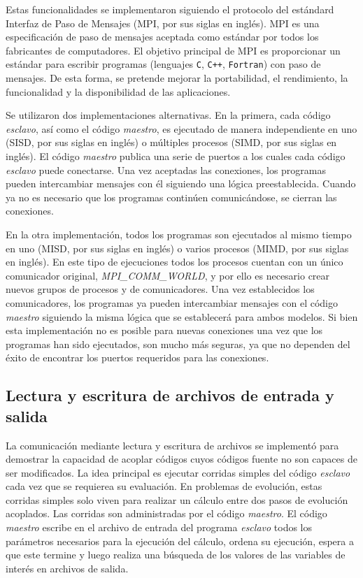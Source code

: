 Estas funcionalidades se implementaron siguiendo el protocolo del estándard Interfaz de Paso de Mensajes (MPI, por sus siglas en inglés). 
MPI es una especificación de paso de mensajes aceptada como estándar
por todos los fabricantes de computadores. 
El objetivo principal de MPI es proporcionar un estándar para escribir
programas (lenguajes \texttt{C}, \texttt{C++}, \texttt{Fortran}) con paso de mensajes. De esta forma, se
pretende mejorar la portabilidad, el rendimiento, la funcionalidad y
la disponibilidad de las aplicaciones.

Se utilizaron dos implementaciones alternativas.
En la primera, cada código \textit{esclavo}, así como el código \textit{maestro},
es ejecutado de manera independiente en uno (SISD, por sus siglas en inglés)
o múltiples procesos (SIMD, por sus siglas en inglés).
El código \textit{maestro} publica una serie de puertos a los cuales cada código \textit{esclavo} puede conectarse.
Una vez aceptadas las conexiones, los programas pueden intercambiar mensajes con él siguiendo una lógica preestablecida.
Cuando ya no es necesario que los programas continúen comunicándose, se cierran las conexiones.

En la otra implementación, todos los programas son ejecutados al mismo tiempo en uno (MISD, por sus siglas en inglés)
o varios procesos (MIMD, por sus siglas en inglés).
En este tipo de ejecuciones todos los procesos cuentan con un único comunicador original, \textit{MPI\_COMM\_WORLD}, y por ello es necesario crear nuevos grupos de procesos y de comunicadores.
Una vez establecidos los comunicadores, los programas ya pueden intercambiar mensajes con el código \textit{maestro} siguiendo la misma lógica que se establecerá para ambos modelos.
Si bien esta implementación no es posible para nuevas conexiones una vez que los programas han sido ejecutados,
son mucho más seguras, ya que no dependen del éxito de encontrar los puertos requeridos para las conexiones.

\subsection*{Lectura y escritura de archivos de entrada y salida}
\label{2:io}

La comunicación mediante lectura y escritura de archivos se implementó para demostrar la capacidad de acoplar códigos cuyos códigos fuente no son capaces de ser modificados.
La idea principal es ejecutar corridas simples del código \textit{esclavo} cada vez que se requierea su evaluación.
En problemas de evolución, estas corridas simples solo viven para realizar un cálculo entre dos pasos de evolución acoplados.
Las corridas son administradas por el código \textit{maestro}.
El código \textit{maestro} escribe en el archivo de entrada del programa \textit{esclavo} todos los parámetros necesarios para la ejecución del cálculo,
ordena su ejecución, espera a que este termine y luego realiza una búsqueda de los valores de las variables de interés en archivos de salida.

